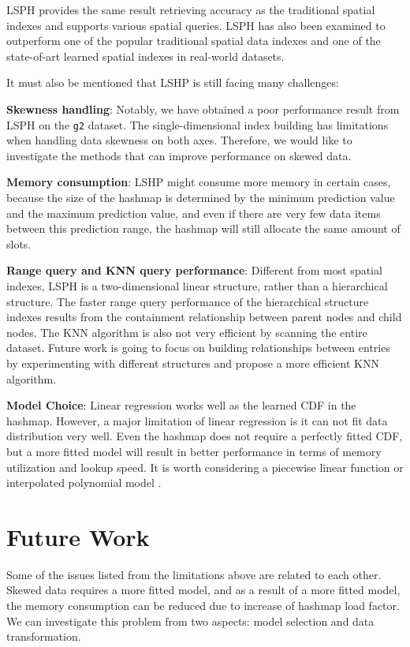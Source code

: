 LSPH provides the same result retrieving accuracy as the traditional spatial indexes and supports various spatial queries. LSPH has also been examined to outperform one of the popular traditional spatial data indexes and one of the state-of-art learned spatial indexes in real-world datasets.

It must also be mentioned that LSHP is still facing many challenges: 

\textbf{Skewness handling}: Notably, we have obtained a poor performance result from LSPH on the \texttt{g2} dataset. The single-dimensional index building has limitations when handling data skewness on both axes. Therefore, we would like to investigate the methods that can improve performance on skewed data. 

\textbf{Memory consumption}: LSHP might consume more memory in certain cases, because the size of the hashmap is determined by the minimum prediction value and the maximum prediction value, and even if there are very few data items between this prediction range, the hashmap will still allocate the same amount of slots. 

\textbf{Range query and KNN query performance}: Different from most spatial indexes, LSPH is a two-dimensional linear structure, rather than a hierarchical structure. The faster range query performance of the hierarchical structure indexes results from the containment relationship between parent nodes and child nodes. The KNN algorithm is also not very efficient by scanning the entire dataset. Future work is going to focus on building relationships between entries by experimenting with different structures and propose a more efficient KNN algorithm. 

\textbf{Model Choice}: Linear regression works well as the learned CDF in the hashmap. However, a major limitation of linear regression is it can not fit data distribution very well. Even the hashmap does not require a perfectly fitted CDF, but a more fitted model will result in better performance in terms of memory utilization and lookup speed. It is worth considering a piecewise linear function or interpolated polynomial model \cite{setiawan2020function}.

\section{Future Work}
Some of the issues listed from the limitations above are related to each other. Skewed data requires a more fitted model, and as a result of a more fitted model, the memory consumption can be reduced due to increase of hashmap load factor. We can investigate this problem from two aspects: model selection and data transformation. 

